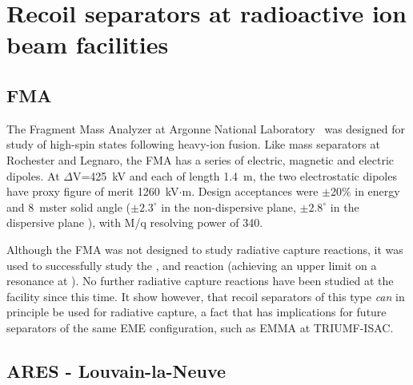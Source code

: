 \section{Recoil separators at radioactive ion beam facilities}

\subsection{FMA}
The Fragment Mass Analyzer at Argonne National Laboratory~\cite{Da92} was designed for study of high-spin states following heavy-ion fusion.  Like mass separators at Rochester and Legnaro, the FMA has a series of electric, magnetic and electric dipoles.   At $\Delta$V=425~kV and each of length 1.4~m, the two electrostatic dipoles have proxy figure of merit 1260~kV$\cdot$m.  Design acceptances were $\pm$20\% in energy and 8~mster solid angle ($\pm2.3^{\circ}$ in the non-dispersive plane, $\pm2.8^{\circ}$ in the dispersive plane \cite{dav12}), with M/q resolving power of 340.

Although the FMA was not designed to study radiative capture reactions, it was used to successfully study the , and   reaction \cite{reh97} (achieving an upper limit on a resonance at ). No further radiative capture reactions have been studied at the facility since this time. It show however, that recoil separators of this type {\em can} in principle be used for radiative capture, a fact that has implications for future separators of the same EME configuration, such as EMMA at TRIUMF-ISAC. 


\subsection{ARES - Louvain-la-Neuve}

